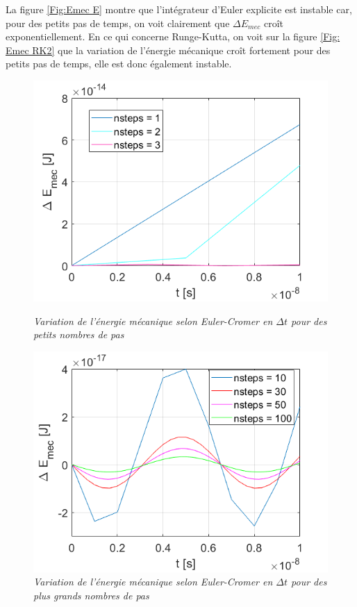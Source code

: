\documentclass[a4paper,12pt,twoside]{article}
\begin{document}
		La figure \ref{Fig:Emec E} montre que l'int\'egrateur d'Euler explicite est instable car, pour des petits pas de temps, on voit clairement que $\Delta E_{mec}$ croît exponentiellement. 
		En ce qui concerne Runge-Kutta, on voit sur la figure \ref{Fig: Emec RK2} que la variation de l'\'energie m\'ecanique croît fortement pour des petits pas de temps, elle est donc \'egalement instable.
		
				\begin{figure}[h]
				\begin{minipage}[c]{.46\linewidth}
					\centering
					\includegraphics[scale = 0.6]{D_E_mec_EC_n=1_2_3.png}
					\caption{\em\label{Fig:Emec EC} Variation de l'\'energie m\'ecanique selon Euler-Cromer en $\Delta t$ pour des petits nombres de pas }
				\end{minipage}
				\hfill%
				\begin{minipage}[c]{.46\linewidth}
					\centering
					\includegraphics[scale = 0.6]{D_E_mec_Ec_n=10_20_50_100.png}
					\caption{\em\label{Fig: Emec ECC} Variation de l'\'energie m\'ecanique selon Euler-Cromer en $\Delta t$ pour des plus grands nombres de pas}
				\end{minipage}
			\end{figure}
		
\end{document}
